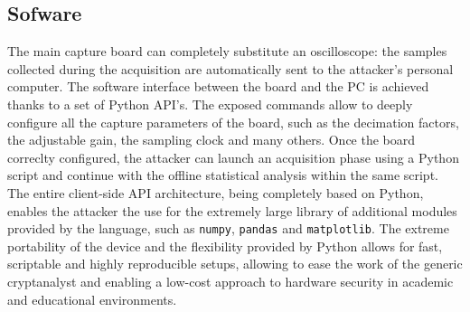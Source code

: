         \subsection{\cw{} Sofware}
            The \cw{} main capture board can completely substitute an oscilloscope: the samples collected during the acquisition are automatically sent to the attacker's personal computer. The software interface between the board and the PC is achieved thanks to a set of Python API's. The exposed commands allow to deeply configure all the capture parameters of the board, such as the decimation factors, the adjustable gain, the sampling clock and many others. Once the board correclty configured, the attacker can launch an acquisition phase using a Python script and continue with the offline statistical analysis within the same script. The entire client-side API architecture, being completely based on Python, enables the attacker the use for the extremely large library of additional modules provided by the language, such as \texttt{numpy}, \texttt{pandas} and \texttt{matplotlib}. The extreme portability of the device and the flexibility provided by Python allows for fast, scriptable and highly reproducible setups, allowing to ease the work of the generic cryptanalyst and enabling a low-cost approach to hardware security in academic and educational environments.

